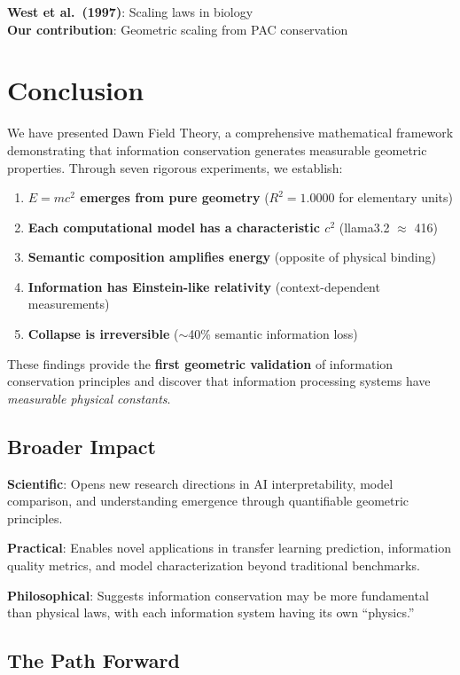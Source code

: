 \documentclass[11pt,a4paper]{article}
\begin{document}
\textbf{West et al.\ (1997)}: Scaling laws in biology\\
\textbf{Our contribution}: Geometric scaling from PAC conservation

\section{Conclusion}

We have presented Dawn Field Theory, a comprehensive mathematical framework demonstrating that information conservation generates measurable geometric properties. Through seven rigorous experiments, we establish:

\begin{enumerate}
    \item \textbf{$E=mc^2$ emerges from pure geometry} ($R^2=1.0000$ for elementary units)
    \item \textbf{Each computational model has a characteristic $c^2$} (llama3.2 $\approx$ 416)
    \item \textbf{Semantic composition amplifies energy} (opposite of physical binding)
    \item \textbf{Information has Einstein-like relativity} (context-dependent measurements)
    \item \textbf{Collapse is irreversible} ($\sim$40\% semantic information loss)
\end{enumerate}

These findings provide the \textbf{first geometric validation} of information conservation principles and discover that information processing systems have \emph{measurable physical constants}.

\subsection{Broader Impact}

\textbf{Scientific}: Opens new research directions in AI interpretability, model comparison, and understanding emergence through quantifiable geometric principles.

\textbf{Practical}: Enables novel applications in transfer learning prediction, information quality metrics, and model characterization beyond traditional benchmarks.

\textbf{Philosophical}: Suggests information conservation may be more fundamental than physical laws, with each information system having its own ``physics.''

\subsection{The Path Forward}
\end{document}
